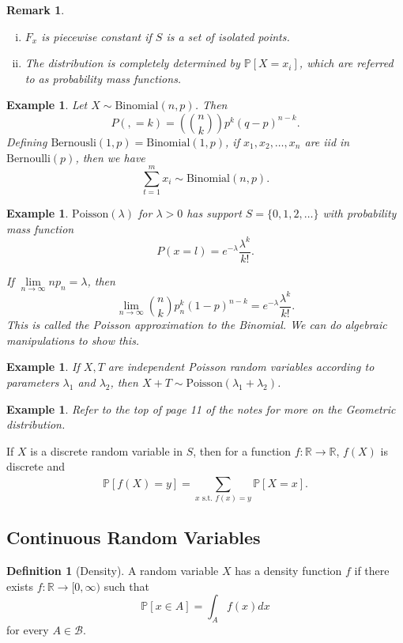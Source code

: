 \documentclass{tufte-handout}
\newcommand*\R{\mathbb{R}}
\renewcommand{\P}{\mathbb{P}}
\newtheorem{rmk}[thm]{Remark}
\newtheorem{ex}[thm]{Example}
\theoremstyle{definition}
\newtheorem{defn}[thm]{Definition}
\begin{document}
\begin{rmk}
	\begin{enumerate}[(i)]
		\item $F_x$ is piecewise constant if $S$ is a set of isolated points.
		\item The distribution is completely determined by $\P\left[X = x_i\right]$, which are referred to as probability mass functions.
	\end{enumerate}
\end{rmk}

\begin{ex}
	Let $X \sim \text{Binomial}(n,p)$. Then \[
		P(, = k ) = (\binom{n}{k}) p^k (q-p)^{n-k}
	.\] 
	Defining $\text{Bernousli}(1,p) = \text{Binomial}(1,p)$, if $x_1,x_2,\ldots,x_n$ are iid in $\text{Bernoulli}(p)$, then we have \[
		\sum\limits_{t=1}^{m} x_i \sim \text{Binomial}(n,p)
	.\] 
\end{ex}

\begin{ex}
	$\text{Poisson}(\lambda)$ for $\lambda >0$ has support $S = \{0,1,2,\ldots\}$ with probability mass function \[
		P(x=l) = e^{-\lambda} \frac{\lambda^k}{k!}
	.\] 

	If $\lim\limits_{n \to \infty} n p_n = \lambda$, then \[
		\lim\limits_{n \to \infty} \binom{n}{k} p_n^k (1-p)^{n-k} = e^{-\lambda} \frac{\lambda^k}{k!}.
	\] This is called the Poisson approximation to the Binomial. We can do algebraic manipulations to show this.
\end{ex}

\begin{ex}
	If $X,T$ are independent Poisson random variables according to parameters $\lambda_1$ and $\lambda_2$, then $X+T \sim \text{Poisson}(\lambda_1 + \lambda_2)$.
\end{ex}

\begin{ex}
	Refer to the top of page 11 of the notes for more on the Geometric distribution.
\end{ex}

If $X$ is a discrete random variable in $S$, then for a function $f: \R\to \R$, $f(X)$ is discrete and \[
	\P\left[f(X) = y\right] = \sum\limits_{x \text{ s.t. } f(x) = y}^{} \P\left[X = x\right] 
.\] 

\subsection{Continuous Random Variables}

\begin{defn}[Density]
	A random variable $X$ has a density function $f$ if there exists $f: \R \to [0,\infty)$ such that \[
		\P\left[x \in A\right] = \int_{A}^{} f(x)dx
	\] for every $A \in \mathscr{B}$.
\end{defn}
\end{document}
